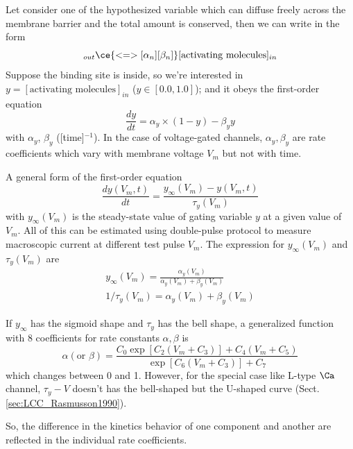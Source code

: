 Let consider one of the hypothesized variable which can diffuse freely across
the membrane barrier and the total amount is conserved, then we can write in the form
\begin{equation}
  [\text{activating molecules}]_{out} \ce{<=>[\alpha_n][\beta_n]}
  [\text{activating molecules}]_{in}
\end{equation}
Suppose the binding site is inside, so we're interested in
$y=[\text{activating molecules}]_{in}$ ($y \in [0.0,1.0]$);
and it obeys the first-order equation
\begin{equation}
  \frac{dy}{dt} = \alpha_y \times (1-y) - \beta_y y
\end{equation}
with $\alpha_y$, $\beta_y$ ([time]$^{-1}$). In the case of voltage-gated
channels, $\alpha_y, \beta_y$ are rate coefficients which vary with membrane
voltage $V_m$ but not with time.

A general form of the first-order equation
\begin{equation}
\frac{dy(V_m,t)}{dt} = \frac{y_\infty(V_m) - y(V_m,t)}{\tau_y(V_m)}
\end{equation}
with $y_\infty(V_m)$ is the steady-state value of gating variable $y$ at a
given value of $V_m$. All of this can be estimated using double-pulse protocol
to measure macroscopic current at different test pulse $V_m$. The expression for
$y_\infty(V_m)$ and $\tau_y(V_m)$  are
\begin{equation}
\begin{split}
y_\infty(V_m) = \frac{\alpha_y(V_m)}{\alpha_y(V_m) + \beta_y(V_m)} \\
1/\tau_y(V_m) = \alpha_y(V_m) + \beta_y(V_m)
\end{split}
\end{equation}

If $y_\infty$ has the sigmoid shape and $\tau_y$ has the bell shape, a
generalized function with 8 coefficients for rate constants $\alpha, \beta$ is
\begin{equation}
 \label{eq:578_new}
 \alpha (\text{or } \beta) = \frac{C_0 \exp [C_2(V_m + C_3)] +C_4(V_m +C_5)}{\exp [C_6(V_m +C_3)] + C_7}
\end{equation}
which changes between 0 and 1. However, for the special case like L-type $\Ca$
channel, $\tau_y-V$ doesn't has the bell-shaped but the U-shaped curve
(Sect.\ref{sec:LCC_Rasmusson1990}).

So, the difference in the kinetics behavior of one component and another are
reflected in the individual rate coefficients.



